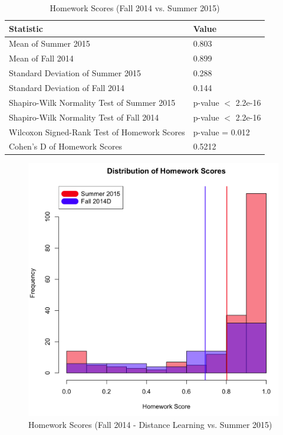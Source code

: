 \pagebreak\clearpage

\begin{small}
\begin{table}
  \centering
  \begin{tabular}{|l|l|}
    \hline
    \textbf{Statistic} & \textbf{Value} \\
	\hline
	Mean of Summer 2015 & 0.803 \\
	\hline
	Mean of Fall 2014 & 0.899 \\
	\hline
	Standard Deviation of Summer 2015 & 0.288 \\
	\hline
	Standard Deviation of Fall 2014 & 0.144 \\
	\hline
	Shapiro-Wilk Normality Test of Summer 2015 & p-value $<$ 2.2e-16 \\
	\hline
	Shapiro-Wilk Normality Test of Fall 2014 & p-value $<$ 2.2e-16 \\
	\hline
	Wilcoxon Signed-Rank Test of Homework Scores & p-value = 0.012 \\
	\hline
	Cohen's D of Homework Scores & 0.5212 \\
	\hline
  \end{tabular}
	\caption{Homework Scores (Fall 2014 vs. Summer 2015)}
  \label{fig:hwFa14Su15}
\end{table}
\end{small}

\pagebreak\clearpage

\begin{figure}
	\centering
	\includegraphics[width=5in]{img/chapter4/hw_su15_vs_f14d}
	\caption{Homework Scores (Fall 2014 - Distance Learning vs. Summer 2015)}
  \label{fig:hwf14dSu15}
\end{figure}

